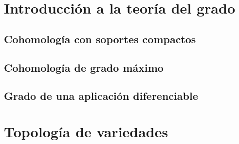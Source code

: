 \documentclass[12pt,a4paper]{book}
\theoremstyle{definition} \newtheorem{defn}[thm]{Definición}
\theoremstyle{definition} \newtheorem{ejemplo}[thm]{Ejemplo}
\theoremstyle{definition} \newtheorem{ejercicio}[thm]{Ejercicio}
\theoremstyle{remark} \newtheorem*{obs}{Observación}
\begin{document}
	  \chapter{Introducción a la teoría del grado}
	  \section{Cohomología con soportes compactos}
	  \section{Cohomología de grado máximo}
	  \section{Grado de una aplicación diferenciable}

	  
	  \appendix
	  \chapter{Topología de variedades}
		      
\end{document}

